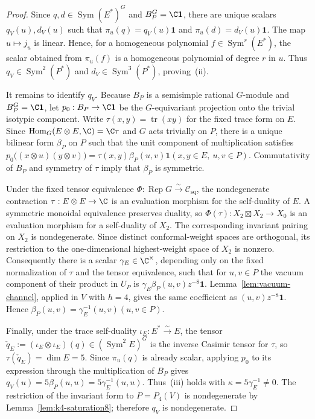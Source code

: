 \documentclass[12pt,leqno]{amsart}
\numberwithin{equation}{section} \newtheorem{thm}{Theorem}[section] \newtheorem{lem}[thm]{Lemma} \newtheorem{ex}[thm]{Example} \newtheorem{prop}[thm]{Proposition} \newtheorem{cor}[thm]{Corollary} \newtheorem{defi}[thm]{Definition} \newtheorem{rmk}[thm]{Remark} \newtheorem{notation}[thm]{Notation}
\newcommand{\one}{\mathbf{1}}
\newcommand{\Rep}{\operatorname{Rep}}
\newcommand{\Sym}{\operatorname{Sym}}
\newcommand{\Hom}{\operatorname{Hom}}
\newcommand{\Csq}{\mathcal C_{\mathrm{sq}}}
\begin{document}
\begin{proof}
Since $q,d\in\Sym(E^*)^G$ and $B_P^G=\C\one$, there are unique scalars $q_V(u),d_V(u)$ such that \(\pi_u(q)=q_V(u)\one\) and \(\pi_u(d)=d_V(u)\one\). The map $u\mapsto j_u$ is linear. Hence, for a homogeneous polynomial $f\in\Sym^r(E^*)$, the scalar obtained from $\pi_u(f)$ is a homogeneous polynomial of degree $r$ in $u$. Thus $q_V\in\Sym^2(P^*)$ and $d_V\in\Sym^3(P^*)$, proving~(ii).

It remains to identify $q_V$. Because $B_P$ is a semisimple rational $G$-module and $B_P^G=\C\one$, let $p_0:B_P\to\C\one$ be the $G$-equivariant projection onto the trivial isotypic component. Write $\tau(x,y)=\operatorname{tr}(xy)$ for the fixed trace form on $E$. Since \(\Hom_G(E\otimes E,\C)=\C\tau\) and $G$ acts trivially on $P$, there is a unique bilinear form $\beta_P$ on $P$ such that the unit component of multiplication satisfies \(p_0\bigl((x\otimes u)(y\otimes v)\bigr) =\tau(x,y)\beta_P(u,v)\one (x,y\in E,\ u,v\in P)\). Commutativity of $B_P$ and symmetry of $\tau$ imply that $\beta_P$ is symmetric.

Under the fixed tensor equivalence \(\Phi:\Rep G\overset\sim\longrightarrow\Csq\), the nondegenerate contraction $\tau:E\otimes E\to\C$ is an evaluation morphism for the self-duality of $E$. A symmetric monoidal equivalence preserves duality, so $\Phi(\tau):X_2\boxtimes X_2\to X_0$ is an evaluation morphism for a self-duality of $X_2$. The corresponding invariant pairing on $X_2$ is nondegenerate. Since distinct conformal-weight spaces are orthogonal, its restriction to the one-dimensional highest-weight space of $X_2$ is nonzero. Consequently there is a scalar $\gamma_E\in\C^\times$, depending only on the fixed normalization of $\tau$ and the tensor equivalence, such that for $u,v\in P$ the vacuum component of their product in $U_P$ is \(\gamma_E\beta_P(u,v)z^{-8}\one\). Lemma~\ref{lem:vacuum-channel}, applied in $V$ with $h=4$, gives the same coefficient as \((u,v)z^{-8}\one\). Hence \(\beta_P(u,v)=\gamma_E^{-1}(u,v) (u,v\in P).\)

Finally, under the trace self-duality $\iota_E:E^*\overset\sim\to E$, the tensor \(\check q_E:=(\iota_E\otimes\iota_E)(q)\in(\Sym^2E)^G\) is the inverse Casimir tensor for $\tau$, so \(\tau(\check q_E)=\dim E=5\). Since $\pi_u(q)$ is already scalar, applying $p_0$ to its expression through the multiplication of $B_P$ gives \(q_V(u)=5\beta_P(u,u)=5\gamma_E^{-1}(u,u).\) Thus~(iii) holds with $\kappa=5\gamma_E^{-1}\ne0$. The restriction of the invariant form to $P=P_4(V)$ is nondegenerate by Lemma~\ref{lem:k4-saturation8}; therefore $q_V$ is nondegenerate.
\end{proof}
\end{document}
